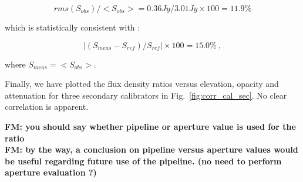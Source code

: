 $$rms(S_{obs})/<S_{obs}>=0.36Jy/3.01Jy \times 100=11.9\%$$

\noindent which is statistically consistent with :

$$|(S_{meas}-S_{ref})/S_{ref}| \times 100=15.0\%~,$$

\noindent where $S_{meas} = <S_{obs}>$.

Finally, we have plotted the flux density ratios versus elevation, opacity and attenuation  for three
secondary calibrators in  Fig.~\ref{fig:corr_cal_sec}. No clear correlation is apparent.


{\bf FM: you should say whether pipeline or aperture value is used for the ratio}\\


{\bf FM: by the way, a conclusion on pipeline versus aperture values would be useful regarding future use of the pipeline. (no need to
perform aperture evaluation ?)}\\


